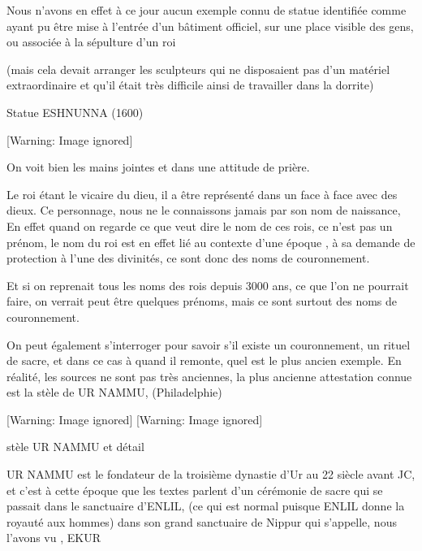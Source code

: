 \documentclass[a4paper,10pt]{article}
\begin{document}
Nous n'avons en effet à ce jour aucun exemple connu de
statue identifiée comme ayant pu être mise à l'entrée
d'un bâtiment officiel, sur une place visible des
gens, ou associée à la sépulture d'un roi

(mais cela devait arranger les sculpteurs qui ne disposaient pas
d'un matériel extraordinaire et qu'il
était très difficile ainsi de travailler dans la dorrite)

Statue ESHNUNNA (1600) 

  [Warning: Image ignored] %
 

On voit bien les mains jointes et dans une attitude de prière.

Le roi étant le vicaire du dieu, il a  être représenté dans un face à
face avec des dieux. Ce personnage, nous ne le connaissons jamais par
son nom de naissance,  En effet quand on regarde ce que veut dire le
nom de ces rois, ce n'est pas un prénom, le nom du roi
est en effet lié au contexte d'une époque , à sa
demande de protection à l'une des divinités, ce sont
donc des noms de couronnement.

Et si on reprenait tous les noms des rois depuis 3000 ans, ce que
l'on ne pourrait faire, on verrait peut être quelques
prénoms, mais ce sont surtout des noms de couronnement.

On peut également s'interroger pour savoir
s'il existe un couronnement, un rituel de sacre, et
dans ce cas à quand il remonte, quel est le plus ancien exemple.  En
réalité, les sources ne sont pas très anciennes, la plus ancienne
attestation connue est la stèle de UR NAMMU, (Philadelphie)

  [Warning: Image ignored] %
   [Warning: Image ignored] %
 

stèle UR NAMMU et détail

UR NAMMU est le fondateur de la troisième dynastie d'Ur
au 22 siècle avant JC, et c'est à cette époque que les
textes parlent d'un cérémonie de sacre qui se passait
dans le sanctuaire d'ENLIL, (ce qui est normal puisque
ENLIL donne la royauté aux hommes) dans son grand sanctuaire de Nippur
qui s'appelle, nous l'avons vu , EKUR
\end{document}
